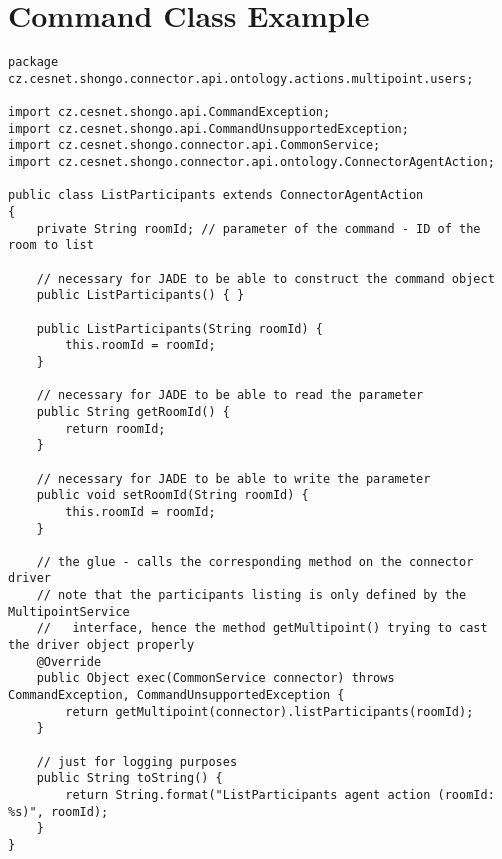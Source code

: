 \section{Command Class Example} \label{appendix:command-class-example}
{ \small
\begin{verbatim}
package cz.cesnet.shongo.connector.api.ontology.actions.multipoint.users;

import cz.cesnet.shongo.api.CommandException;
import cz.cesnet.shongo.api.CommandUnsupportedException;
import cz.cesnet.shongo.connector.api.CommonService;
import cz.cesnet.shongo.connector.api.ontology.ConnectorAgentAction;

public class ListParticipants extends ConnectorAgentAction
{
    private String roomId; // parameter of the command - ID of the room to list

    // necessary for JADE to be able to construct the command object
    public ListParticipants() { }

    public ListParticipants(String roomId) {
        this.roomId = roomId;
    }

    // necessary for JADE to be able to read the parameter
    public String getRoomId() {
        return roomId;
    }

    // necessary for JADE to be able to write the parameter
    public void setRoomId(String roomId) {
        this.roomId = roomId;
    }

    // the glue - calls the corresponding method on the connector driver
    // note that the participants listing is only defined by the MultipointService
    //   interface, hence the method getMultipoint() trying to cast the driver object properly
    @Override
    public Object exec(CommonService connector) throws CommandException, CommandUnsupportedException {
        return getMultipoint(connector).listParticipants(roomId);
    }

    // just for logging purposes
    public String toString() {
        return String.format("ListParticipants agent action (roomId: %s)", roomId);
    }
}
\end{verbatim}
}


